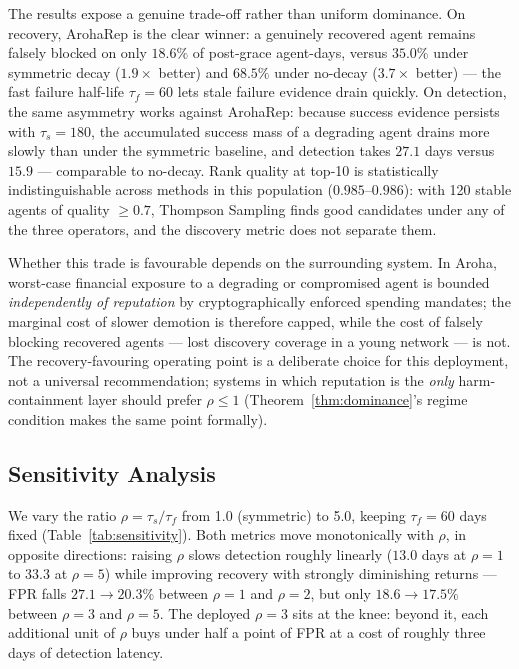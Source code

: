 \documentclass[conference]{IEEEtran}
\begin{document}
The results expose a genuine trade-off rather than uniform
dominance. On recovery, ArohaRep is the clear winner: a
genuinely recovered agent remains falsely blocked on only
$18.6\%$ of post-grace agent-days, versus $35.0\%$ under
symmetric decay ($1.9\times$ better) and $68.5\%$ under
no-decay ($3.7\times$ better) — the fast failure half-life
$\tau_f = 60$ lets stale failure evidence drain quickly. On
detection, the same asymmetry works against ArohaRep: because
success evidence persists with $\tau_s = 180$, the
accumulated success mass of a degrading agent drains more
slowly than under the symmetric baseline, and detection takes
$27.1$ days versus $15.9$ — comparable to no-decay. Rank
quality at top-10 is statistically indistinguishable across
methods in this population ($0.985$–$0.986$): with 120
stable agents of quality $\geq 0.7$, Thompson Sampling finds
good candidates under any of the three operators, and the
discovery metric does not separate them.

Whether this trade is favourable depends on the surrounding
system. In Aroha, worst-case financial exposure to a
degrading or compromised agent is bounded \emph{independently
of reputation} by cryptographically enforced spending
mandates; the marginal cost of slower demotion is therefore
capped, while the cost of falsely blocking recovered agents
— lost discovery coverage in a young network — is not. The
recovery-favouring operating point is a deliberate choice for
this deployment, not a universal recommendation; systems in
which reputation is the \emph{only} harm-containment layer
should prefer $\rho \leq 1$ (Theorem~\ref{thm:dominance}'s
regime condition makes the same point formally).

\subsection{Sensitivity Analysis}

We vary the ratio $\rho = \tau_s / \tau_f$ from 1.0
(symmetric) to 5.0, keeping $\tau_f = 60$ days fixed
(Table~\ref{tab:sensitivity}). Both metrics move
monotonically with $\rho$, in opposite directions: raising
$\rho$ slows detection roughly linearly ($13.0$ days at
$\rho{=}1$ to $33.3$ at $\rho{=}5$) while improving recovery
with strongly diminishing returns — FPR falls $27.1 \to
20.3\%$ between $\rho{=}1$ and $\rho{=}2$, but only $18.6 \to
17.5\%$ between $\rho{=}3$ and $\rho{=}5$. The deployed
$\rho = 3$ sits at the knee: beyond it, each additional unit
of $\rho$ buys under half a point of FPR at a cost of
roughly three days of detection latency.
\end{document}
